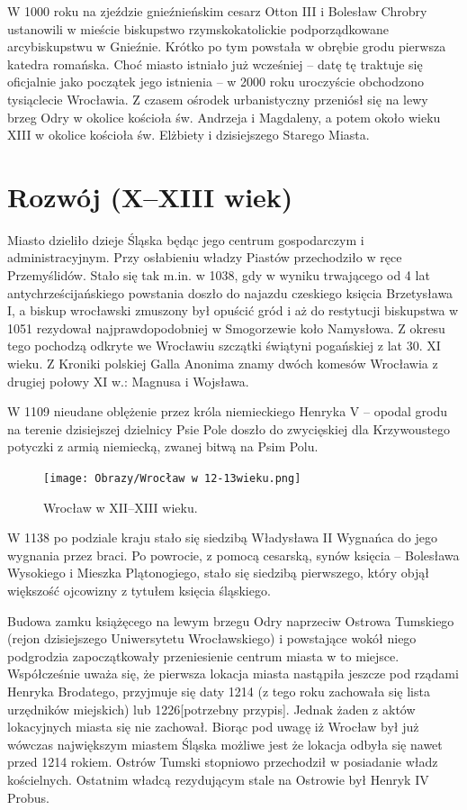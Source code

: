 \documentclass{article}
\let\footnote=\endnote
\begin{document}
W 1000 roku na zjeździe gnieźnieńskim cesarz Otton III i Bolesław Chrobry ustanowili w mieście biskupstwo rzymskokatolickie podporządkowane arcybiskupstwu w Gnieźnie. Krótko po tym powstała w obrębie grodu pierwsza katedra romańska. Choć miasto istniało już wcześniej – datę tę traktuje się oficjalnie jako początek jego istnienia – w 2000 roku uroczyście obchodzono tysiąclecie Wrocławia. Z czasem ośrodek urbanistyczny przeniósł się na lewy brzeg Odry w okolice kościoła św. Andrzeja i Magdaleny, a potem około wieku XIII w okolice kościoła św. Elżbiety i dzisiejszego Starego Miasta.


\section{Rozwój (X–XIII wiek)}
Miasto dzieliło dzieje Śląska będąc jego centrum gospodarczym i administracyjnym. Przy osłabieniu władzy Piastów przechodziło w ręce Przemyślidów. Stało się tak m.in. w 1038, gdy w wyniku trwającego od 4 lat antychrześcijańskiego powstania doszło do najazdu czeskiego księcia Brzetysława I, a biskup wrocławski zmuszony był opuścić gród i aż do restytucji biskupstwa w 1051 rezydował najprawdopodobniej w Smogorzewie koło Namysłowa. Z okresu tego pochodzą odkryte we Wrocławiu szczątki świątyni pogańskiej z lat 30. XI wieku. Z Kroniki polskiej Galla Anonima znamy dwóch komesów Wrocławia z drugiej połowy XI w.: Magnusa i Wojsława\footnote{Tadeusz Szumski, 500 zagadek o Wrocławiu, WP, Warszawa 1971.}.

W 1109 nieudane oblężenie przez króla niemieckiego Henryka V – opodal grodu na terenie dzisiejszej dzielnicy Psie Pole doszło do zwycięskiej dla Krzywoustego potyczki z armią niemiecką, zwanej bitwą na Psim Polu.

\begin{figure}[ht]
\centering
\texttt{[image: Obrazy/Wrocław w 12-13wieku.png]}
\caption{Wrocław w XII–XIII wieku.}
\label{fig:12wiek}
\end{figure}

W 1138 po podziale kraju stało się siedzibą Władysława II Wygnańca do jego wygnania przez braci. Po powrocie, z pomocą cesarską, synów księcia – Bolesława Wysokiego i Mieszka Plątonogiego, stało się siedzibą pierwszego, który objął większość ojcowizny z tytułem księcia śląskiego.

Budowa zamku książęcego na lewym brzegu Odry naprzeciw Ostrowa Tumskiego (rejon dzisiejszego Uniwersytetu Wrocławskiego) i powstające wokół niego podgrodzia zapoczątkowały przeniesienie centrum miasta w to miejsce. Współcześnie uważa się, że pierwsza lokacja miasta nastąpiła jeszcze pod rządami Henryka Brodatego, przyjmuje się daty 1214 (z tego roku zachowała się lista urzędników miejskich) lub 1226[potrzebny przypis]. Jednak żaden z aktów lokacyjnych miasta się nie zachował. Biorąc pod uwagę iż Wrocław był już wówczas największym miastem Śląska możliwe jest że lokacja odbyła się nawet przed 1214 rokiem. Ostrów Tumski stopniowo przechodził w posiadanie władz kościelnych. Ostatnim władcą rezydującym stale na Ostrowie był Henryk IV Probus.
\end{document}
